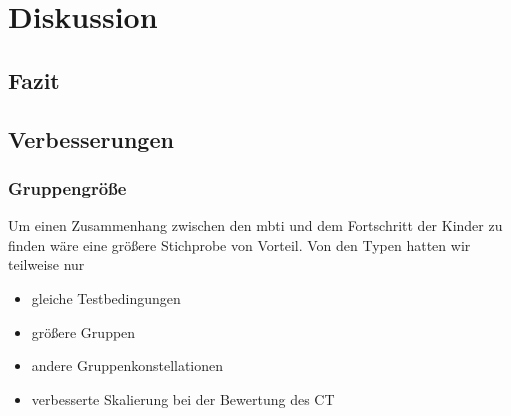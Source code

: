 \chapter{Diskussion}

\section{Fazit}



\section{Verbesserungen}
\subsection{Gruppengröße}
Um einen Zusammenhang zwischen den \acrlong{mbti} und dem Fortschritt der Kinder zu finden wäre eine größere Stichprobe von Vorteil. Von den Typen hatten wir teilweise nur 




\begin{itemize}
	\item gleiche Testbedingungen
	\item größere Gruppen
	\item andere Gruppenkonstellationen
	\item verbesserte Skalierung bei der Bewertung des CT
\end{itemize}

